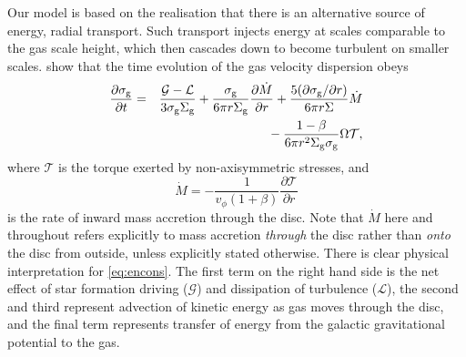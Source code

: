 \documentclass[useAMS,usenatbib]{mn2e}
\newcommand{\calL}{\mathcal{L}}
\newcommand{\calG}{\mathcal{G}}
\newcommand{\calT}{\mathcal{T}}
\begin{document}
Our model is based on the realisation that there is an alternative source of energy, radial transport. Such transport injects energy at scales comparable to the gas scale height, which then cascades down to become turbulent on smaller scales. \citet{krumholz10c} show that the time evolution of the gas velocity dispersion obeys
\begin{eqnarray}
\frac{\partial\sigma_{\rm g}}{\partial t} & = & \frac{\calG-\calL}{3\sigma_{\rm g}\Sigma_{\rm g}} + \frac{\sigma_{\rm g}}{6\pi r\Sigma_{\rm g}} \frac{\partial \dot{M}}{\partial r}
+ \frac{5(\partial\sigma_{\rm g}/\partial r)}{6\pi r\Sigma}\dot{M}
\nonumber \\
& & \qquad {} - \frac{1-\beta}{6\pi r^2\Sigma_{\rm g}\sigma_{\rm g}}\Omega \calT,
\label{eq:encons}
\end{eqnarray}
where $\calT$ is the torque exerted by non-axisymmetric stresses, and
\begin{equation}
\label{eq:mdot}
\dot{M}= -\frac{1}{v_\phi(1+\beta)}\frac{\partial \calT}{\partial r}
\end{equation}
is the rate of inward mass accretion through the disc. Note that $\dot{M}$ here and throughout refers explicitly to mass accretion \textit{through} the disc rather than \textit{onto} the disc from outside, unless explicitly stated otherwise. There is clear physical interpretation for  \autoref{eq:encons}. The first term on the right hand side is the net effect of star formation driving ($\mathcal{G}$) and dissipation of turbulence ($\mathcal{L}$), the second and third represent advection of kinetic energy as gas moves through the disc, and the final term represents transfer of energy from the galactic gravitational potential to the gas.
\end{document}
